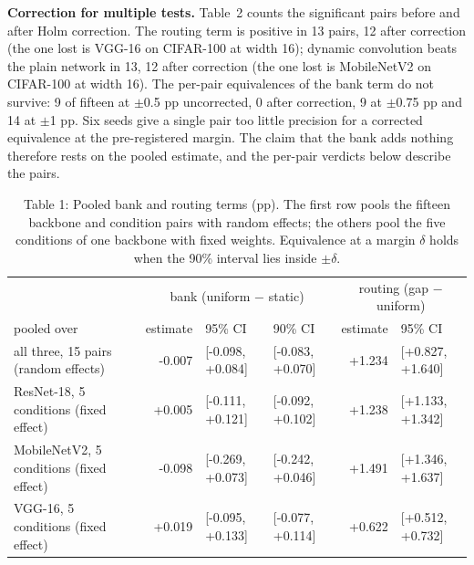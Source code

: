 \documentclass{article}
\begin{document}
\textbf{Correction for multiple tests.}  Table~2 counts the
significant pairs before and after Holm correction. The routing term is
positive in 13 pairs, 12 after correction (the
one lost is VGG-16 on CIFAR-100 at width 16); dynamic convolution beats the plain network
in 13, 12 after correction (the one lost is
MobileNetV2 on CIFAR-100 at width 16). The per-pair equivalences of the bank term do not
survive: 9 of fifteen at $\pm$0.5 pp uncorrected,
0 after correction, 9 at
$\pm$0.75 pp and 14 at $\pm$1 pp. Six seeds give
a single pair too little precision for a corrected equivalence at the
pre-registered margin. The claim that the bank adds nothing therefore rests
on the pooled estimate, and the per-pair verdicts below describe the
pairs.

\begin{table}
\caption{Table 1: Pooled bank and routing terms (pp). The first row pools the
fifteen backbone and condition pairs with random effects; the others pool
the five conditions of one backbone with fixed weights. Equivalence at a
margin $\delta$ holds when the 90\% interval lies inside
$\pm\delta$.}

\begin{tabular}{l rll rl}
\toprule
& \multicolumn{3}{c}{bank (uniform − static)}
& \multicolumn{2}{c}{routing (gap − uniform)} \\

pooled over & estimate & 95\% CI & 90\% CI & estimate & 95\% CI \\
\midrule
all three, 15 pairs (random effects) & -0.007 & [-0.098, +0.084] & [-0.083, +0.070] & +1.234 & [+0.827, +1.640] \\
ResNet-18, 5 conditions (fixed effect) & +0.005 & [-0.111, +0.121] & [-0.092, +0.102] & +1.238 & [+1.133, +1.342] \\
MobileNetV2, 5 conditions (fixed effect) & -0.098 & [-0.269, +0.073] & [-0.242, +0.046] & +1.491 & [+1.346, +1.637] \\
VGG-16, 5 conditions (fixed effect) & +0.019 & [-0.095, +0.133] & [-0.077, +0.114] & +0.622 & [+0.512, +0.732] \\
\bottomrule
\end{tabular}
\end{table}
\end{document}

